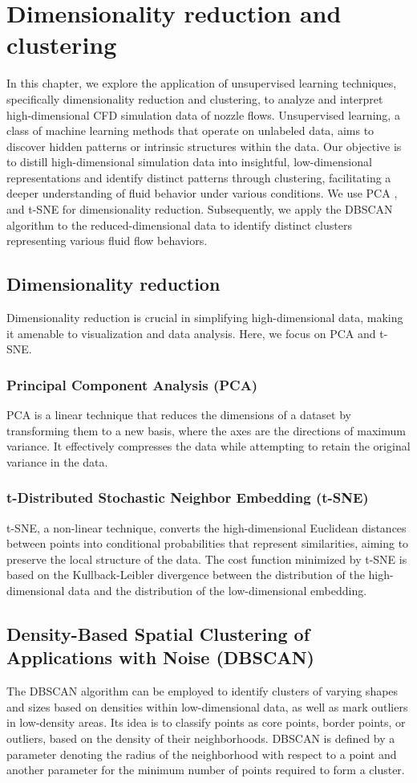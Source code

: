 \chapter{Dimensionality reduction and clustering}
\label{chap:cluster}
In this chapter, we explore the application of unsupervised learning techniques, specifically dimensionality reduction and clustering, to analyze and interpret high-dimensional CFD simulation data of nozzle flows. Unsupervised learning, a class of machine learning methods that operate on unlabeled data, aims to discover hidden patterns or intrinsic structures within the data. Our objective is to distill high-dimensional simulation data into insightful, low-dimensional representations and identify distinct patterns through clustering, facilitating a deeper understanding of fluid behavior under various conditions. We use \gls{PCA} \cite{pearson1901pca}, and \gls{t-SNE} \cite{tsne} for dimensionality reduction. Subsequently, we apply the \gls{DBSCAN} algorithm \cite{ester1996dbscan} to the reduced-dimensional data to identify distinct clusters representing various fluid flow behaviors.
\section{Dimensionality reduction}
Dimensionality reduction is crucial in simplifying high-dimensional data, making it amenable to visualization and data analysis. Here, we focus on PCA and t-SNE.
\subsection{Principal Component Analysis (PCA)}
PCA is a linear technique that reduces the dimensions of a dataset by transforming them to a new basis, where the axes are the directions of maximum variance. It effectively compresses the data while attempting to retain the original variance in the data.
\subsection{t-Distributed Stochastic Neighbor Embedding (t-SNE)}
t-SNE, a non-linear technique, converts the high-dimensional Euclidean distances between points into conditional probabilities that represent similarities, aiming to preserve the local structure of the data. The cost function minimized by t-SNE is based on the Kullback-Leibler divergence \cite{csis} between the distribution of the high-dimensional data and the distribution of the low-dimensional embedding.
\section{Density-Based Spatial Clustering of Applications with Noise (DBSCAN)}
The DBSCAN algorithm can be employed to identify clusters of varying shapes and sizes based on densities within low-dimensional data, as well as mark outliers in low-density areas. Its idea is to classify points as core points, border points, or outliers, based on the density of their neighborhoods. DBSCAN is defined by a parameter denoting the radius of the neighborhood with respect to a point and another parameter for the minimum number of points required to form a cluster.
